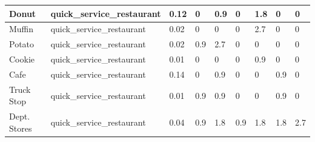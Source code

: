 \begin{table}[]
\begin{tabular}{|l|l|l|l|l|l|l|l|l|}
    Donut                    & quick\_service\_restaurant      & 0.12                               & 0                & 0.9            & 0                & 1.8           & 0              & 0                \\ \hline
    Muffin                   & quick\_service\_restaurant      & 0.02                               & 0                & 0              & 0                & 2.7           & 0              & 0                \\ \hline
    Potato                   & quick\_service\_restaurant      & 0.02                               & 0.9              & 2.7            & 0                & 0             & 0              & 0                \\ \hline
    Cookie                   & quick\_service\_restaurant      & 0.01                               & 0                & 0              & 0                & 0.9           & 0              & 0                \\ \hline
    Cafe                     & quick\_service\_restaurant      & 0.14                               & 0                & 0.9            & 0                & 0             & 0.9            & 0                \\ \hline
    Truck Stop               & quick\_service\_restaurant      & 0.01                               & 0.9              & 0.9            & 0                & 0             & 0.9            & 0                \\ \hline
    Dept. Stores             & quick\_service\_restaurant      & 0.04                               & 0.9              & 1.8            & 0.9              & 1.8           & 1.8            & 2.7              \\ \hline    
    \end{tabular}
    \end{table}